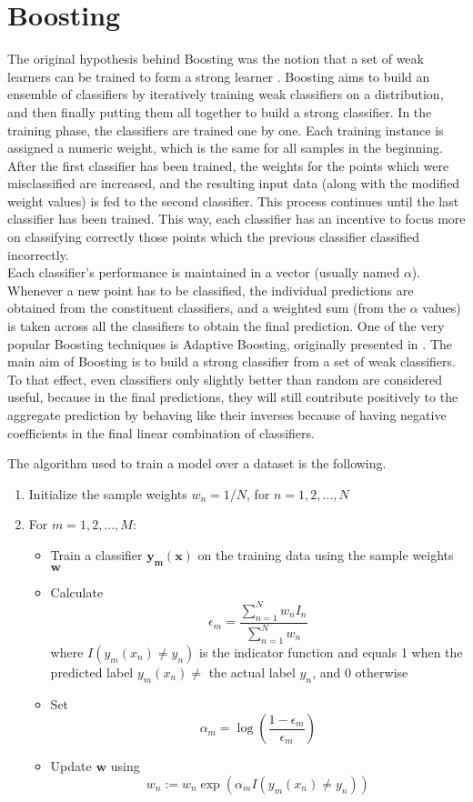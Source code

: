 \section{Boosting}
The original hypothesis behind Boosting was the notion that a set of weak learners can be trained to form a strong learner \cite{kearns1988thoughts}. Boosting aims to build an ensemble of classifiers by iteratively training weak classifiers on a distribution, and then finally putting them all together to build a strong classifier. In the training phase, the classifiers are trained one by one. Each training instance is assigned a numeric weight, which is the same for all samples in the beginning. After the first classifier has been trained, the weights for the points which were misclassified are increased, and the resulting input data (along with the modified weight values) is fed to the second classifier. This process continues until the last classifier has been trained. This way, each classifier has an incentive to focus more on classifying correctly those points which the previous classifier classified incorrectly.\\

Each classifier's performance is maintained in a vector (usually named $\alpha$). Whenever a new point has to be classified, the individual predictions are obtained from the constituent classifiers, and a weighted sum (from the $\alpha$ values) is taken across all the classifiers to obtain the final prediction. One of the very popular Boosting techniques is Adaptive Boosting, originally presented in \cite{freund1995desicion}. The main aim of Boosting is to build a strong classifier from a set of weak classifiers. To that effect, even classifiers only slightly better than random are considered useful, because in the final predictions, they will still contribute positively to the aggregate prediction by behaving like their inverses because of having negative coefficients in the final linear combination of classifiers.

The algorithm used to train a model over a dataset is the following.

\begin{enumerate}
    \item{Initialize the sample weights $w_n = 1/N$, for $n = 1, 2, ..., N$}
    \item{
    For $m = 1, 2, ..., M$:
    \begin{itemize}
        \item{Train a classifier $\mathbf{y_m(x)}$ on the training data using the sample weights $\mathbf{w}$}
        \item{Calculate $$\epsilon_m = \frac{\displaystyle \sum_{n = 1}^{N} w_n I_n}{\displaystyle \sum_{n = 1}^{N} w_n}$$ where $I(y_m(x_n) \neq y_n)$ is the indicator function and equals 1 when the predicted label $y_m(x_n) \neq$ the actual label $y_n$, and 0 otherwise}
        \item{Set $$\alpha_m = \log(\frac{1 - \epsilon_m}{\epsilon_m})$$}
        \item{Update $\mathbf{w}$ using $$w_n := w_n \exp(\alpha_m I(y_m(x_n) \neq y_n))$$}
    \end{itemize}
    }
\end{enumerate}

